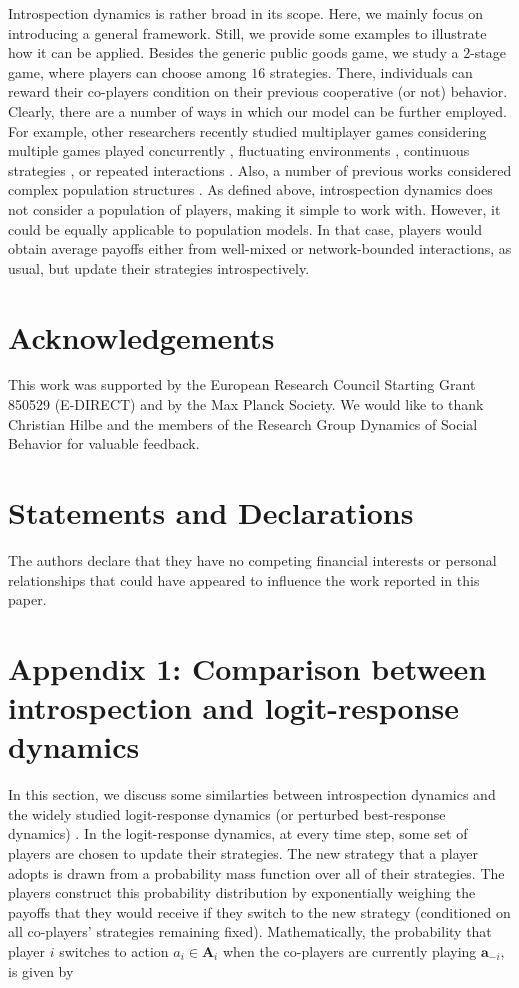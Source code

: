 \documentclass[11pt]{article}
\theoremstyle{plainCl1}
\theoremstyle{plainCl2}
\newcommand{\A}{\mathbf{A}}
\newcommand{\abf}{\mathbf{a}}
\begin{document}
\noindent Introspection dynamics is rather broad in its scope. Here, we mainly focus on introducing a general framework. Still, we provide some examples to illustrate how it can be applied. Besides the generic public goods game, we study a $2$-stage game, where players can choose among $16$ strategies. There, individuals can reward their co-players condition on their previous cooperative (or not) behavior. Clearly, there are a number of ways in which our model can be further employed. For example, other researchers recently studied multiplayer games considering multiple games played concurrently \cite{Venkateswaran:PRSB:2019}, fluctuating environments \cite{Baron:JRSOP:2018}, continuous strategies \cite{Molina:JMB:2017}, or repeated interactions \cite{Hilbe:JTB:2015, Wang:PTRSB:2023}. Also, a number of previous works considered complex population structures \cite{Broom:JTB:2012, Wu:Games:2013, Perc:JRSI:2013, Pena:JTB:2015, Pena:JRSI:2016, Pattni:JTB:2017, Su:PNAS:2022}. As defined above, introspection dynamics does not consider a population of players, making it simple to work with. However, it could be equally applicable to population models. In that case, players would obtain average payoffs either from well-mixed or network-bounded interactions, as usual, but update their strategies introspectively.


\section*{Acknowledgements}
This work was supported by the European Research Council Starting Grant 850529 (E-DIRECT) and by the Max Planck Society. We would like to thank Christian Hilbe and the members of the Research Group Dynamics of Social Behavior for valuable feedback.
\section*{Statements and Declarations}
The authors declare that they have no competing financial interests or personal relationships that could have appeared to influence the work reported in this paper.
\newpage
\section*{Appendix 1: Comparison between introspection and logit-response dynamics}

In this section, we discuss some similarties between introspection dynamics and the widely studied logit-response dynamics (or perturbed best-response dynamics) \cite{Blume:GEB:1993, Alos-Ferrer:GEB:2010}. In the logit-response dynamics, at every time step, some set of players are chosen to update their strategies. The new strategy that a player adopts is drawn from a probability mass function over all of their strategies. The players construct this probability distribution by exponentially weighing the payoffs that they would receive if they switch to the new strategy (conditioned on all co-players' strategies remaining fixed). Mathematically, the probability that player $i$ switches to action $a_i \in \A_i$ when the co-players are currently playing $\abf_{-i}$, is given by
\end{document}
